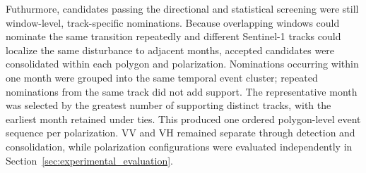 Futhurmore, candidates passing the directional and statistical screening were still window-level, track-specific nominations. Because overlapping windows could nominate the same transition repeatedly and different Sentinel-1 tracks could localize the same disturbance to adjacent months, accepted candidates were consolidated within each polygon and polarization. Nominations occurring within one month were grouped into the same temporal event cluster; repeated nominations from the same track did not add support. The representative month was selected by the greatest number of supporting distinct tracks, with the earliest month retained under ties. This produced one ordered polygon-level event sequence per polarization. VV and VH remained separate through detection and consolidation, while polarization configurations were evaluated independently in Section~\ref{sec:experimental_evaluation}.








